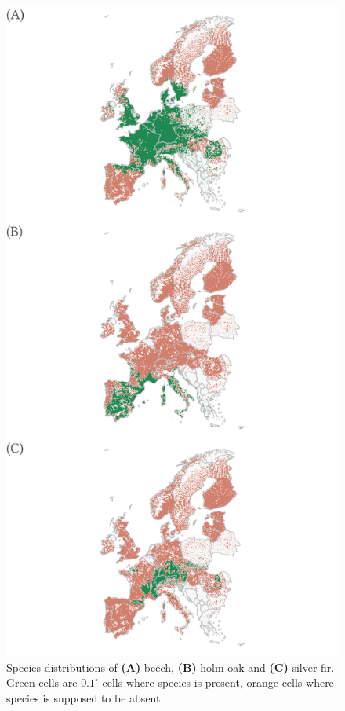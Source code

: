 


\begin{figure}
\vspace*{-2cm}
\centering
\includegraphics{chapter1/figs/supp/distributionmaps.pdf}
\caption{Species distributions of \textbf{(A)} beech, \textbf{(B)} holm
oak and \textbf{(C)} silver fir. Green cells are \(0.1^\circ\) cells
where species is present, orange cells where species is supposed to be
absent.}
\end{figure}

